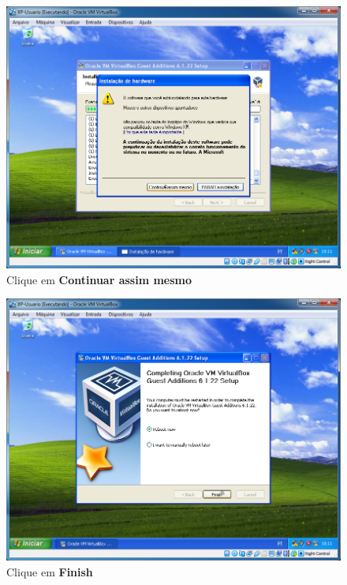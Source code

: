 \documentclass[10pt]{article}
\begin{document}
\begin{figure}[H]
    \centering
    \caption{Clique em \textbf{Continuar assim mesmo}}
    \label{fig:3121}
    \includegraphics[width=\linewidth]{images/ativacao_das_maquinas_virtuais/configuracao_inicial_das_maquinas_virtuais/021.png}
\end{figure}
\begin{figure}[H]
    \centering
    \caption{Clique em \textbf{Finish}}
    \label{fig:3122}
    \includegraphics[width=\linewidth]{images/ativacao_das_maquinas_virtuais/configuracao_inicial_das_maquinas_virtuais/022.png}
\end{figure}
\end{document}
